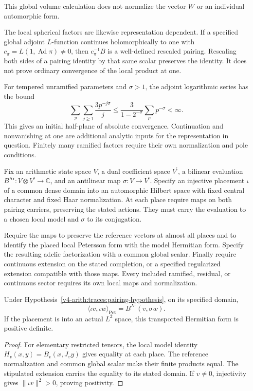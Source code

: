 This global volume calculation does not normalize the vector $W$ or an
individual automorphic form.

The local spherical factors are likewise representation dependent. If a
specified global adjoint $L$-function continues holomorphically to one with
$c_\pi=L(1,\operatorname{Ad}\pi)\ne0$, then $c_\pi^{-1}B$ is a well-defined
rescaled pairing. Rescaling both sides of a pairing identity by that same
scalar preserves the identity. It does not prove ordinary convergence of the
local product at one.

For tempered unramified parameters and $\sigma>1$, the adjoint logarithmic
series has the bound
\[
 \sum_p\sum_{j\geq1}\frac{3p^{-j\sigma}}j
   \leq\frac{3}{1-2^{-\sigma}}\sum_p p^{-\sigma}<\infty.
\]
This gives an initial half-plane of absolute convergence. Continuation and
nonvanishing at one are additional analytic inputs for the representation in
question. Finitely many ramified factors require their own normalization and
pole conditions.

\begin{hypothesis}
\label{v4-arith:traces:pairing-hypothesis}
Fix an arithmetic state space $V$, a dual coefficient space $V^!$, a
bilinear evaluation $B^{\mathrm{Ar}}:V\otimes V^!\to\mathbb C$, and an
antilinear map $\sigma:V\to V^!$. Specify an injective placement $\iota$ of
a common dense domain into an automorphic Hilbert space with fixed central
character and fixed Haar normalization. At each place require maps on both
pairing carriers, preserving the stated actions. They must carry the
evaluation to a chosen local model and $\sigma$ to its conjugation.

Require the maps to preserve the reference vectors at almost all places and
to identify the placed local Petersson form with the model Hermitian form.
Specify the resulting adelic factorization with a common global scalar.
Finally require continuous extension on the stated completion, or a
specified regularized extension compatible with those maps. Every included
ramified, residual, or continuous sector requires its own local maps and
normalization.
\end{hypothesis}

\begin{proposition}
\label{v4-arith:traces:arithmetic-pairing}
Under Hypothesis~\ref{v4-arith:traces:pairing-hypothesis}, on its specified
domain,
\[
 \langle\iota v,\iota w\rangle_{\mathrm{Pet}}
      =B^{\mathrm{Ar}}(v,\sigma w).
\]
If the placement is into an actual $L^2$ space, this transported Hermitian
form is positive definite.
\end{proposition}
\begin{proof}
For elementary restricted tensors, the local model identity
$H_v(x,y)=B_v(x,J_vy)$ gives equality at each place. The reference
normalization and common global scalar make their finite products equal. The
stipulated extension carries the equality to its stated domain. If $v\ne0$,
injectivity gives $\|\iota v\|^2>0$, proving positivity.
\end{proof}

